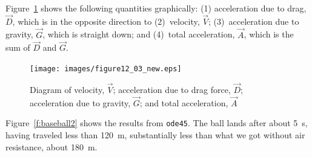 Figure~\ref{fig:vector3} shows the following quantities graphically:  (1) acceleration due to drag, $\vec{D}$, which is in the opposite direction to (2)~velocity, $\vec{V}$; (3)~acceleration due to gravity, $\vec{G}$, which is straight down; and (4)~total acceleration, $\vec{A}$, which is the sum of $\vec{D}$ and $\vec{G}$.

\begin{figure}[h]
\centerline{\texttt{[image: images/figure12\_03\_new.eps]}}
\caption{Diagram of velocity, $\vec{V}$; acceleration due to drag force,
$\vec{D}$; acceleration due to gravity, $\vec{G}$; and total acceleration, $\vec{A}$}
\label{fig:vector3}
\end{figure}


Figure~\ref{f:baseball2} shows the results from \lstinline{ode45}.  The ball lands after about \SI{5}{\second}, having traveled less than \SI{120}{\meter}, substantially less than what we got without air resistance, about \SI{180}{\meter}.


